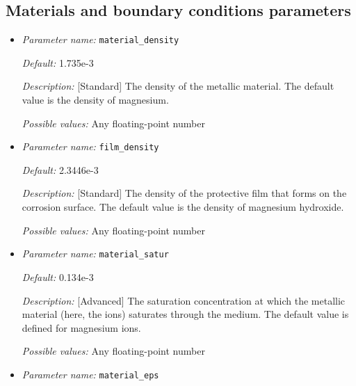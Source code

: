 \subsection{Materials and boundary conditions parameters}
\label{parameters:material}

\begin{itemize}
\item {\it Parameter name:} {\tt material\_density}
\label{parameters:material_density}


{\it Default:} 1.735e-3

{\it Description:} [Standard] The density of the metallic material. The default value is the density of magnesium.

{\it Possible values:} Any floating-point number


\item {\it Parameter name:} {\tt film\_density}
\label{parameters:film_density}


{\it Default:} 2.3446e-3

{\it Description:} [Standard] The density of the protective film that forms on the corrosion surface. The default value is the density of magnesium hydroxide.

{\it Possible values:} Any floating-point number


\item {\it Parameter name:} {\tt material\_satur}
\label{parameters:material_satur}


{\it Default:} 0.134e-3

{\it Description:} [Advanced] The saturation concentration at which the metallic material (here, the ions) saturates through the medium. The default value is defined for magnesium ions.

{\it Possible values:} Any floating-point number


\item {\it Parameter name:} {\tt material\_eps}
\label{parameters:material_eps}



\end{itemize}
